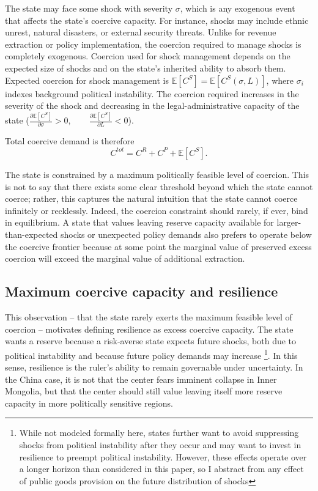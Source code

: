 \documentclass[12pt]{article}
\newcommand{\E}{\mathbb{E}}
\begin{document}
The state may face some shock with severity $\sigma$, which is any exogenous event that affects the state's coercive capacity. For instance, shocks may include ethnic unrest, natural disasters, or external security threats. Unlike for revenue extraction or policy implementation, the coercion required to manage shocks is completely exogenous. Coercion used for shock management depends on the expected size of shocks and on the state's inherited ability to absorb them. Expected coercion for shock management is $\E[C^S] = \E[C^S(\sigma,L)]$, where $\sigma_i$ indexes background political instability. The coercion required increases in the severity of the shock and decreasing in the legal-administrative capacity of the state ($\frac{\partial \E[C^S]}{\partial \sigma} > 0, \qquad \frac{\partial \E[C^S]}{\partial L} < 0$).

Total coercive demand is therefore
\begin{equation}
C^{tot} = C^R + C^P + \E[C^S].
\end{equation}

The state is constrained by a maximum politically feasible level of coercion. This is not to say that there exists some clear threshold beyond which the state cannot coerce; rather, this captures the natural intuition that the state cannot coerce infinitely or recklessly. Indeed, the coercion constraint should rarely, if ever, bind in equilibrium. A state that values leaving reserve capacity available for larger-than-expected shocks or unexpected policy demands also prefers to operate below the coercive frontier because at some point the marginal value of preserved excess coercion will exceed the marginal value of additional extraction.

\subsection{Maximum coercive capacity and resilience}

This observation -- that the state rarely exerts the maximum feasible level of coercion -- motivates defining resilience as excess coercive capacity. The state wants a reserve because a risk-averse state expects future shocks, both due to political instability and because future policy demands may increase \footnote{While not modeled formally here, states further want to avoid suppressing shocks from political instability after they occur and may want to invest in resilience to preempt political instability. However, these effects operate over a longer horizon than considered in this paper, so I abstract from any effect of public goods provision on the future distribution of shocks}. In this sense, resilience is the ruler's ability to remain governable under uncertainty. In the China case, it is not that the center fears imminent collapse in Inner Mongolia, but that the center should still value leaving itself more reserve capacity in more politically sensitive regions.
\end{document}
